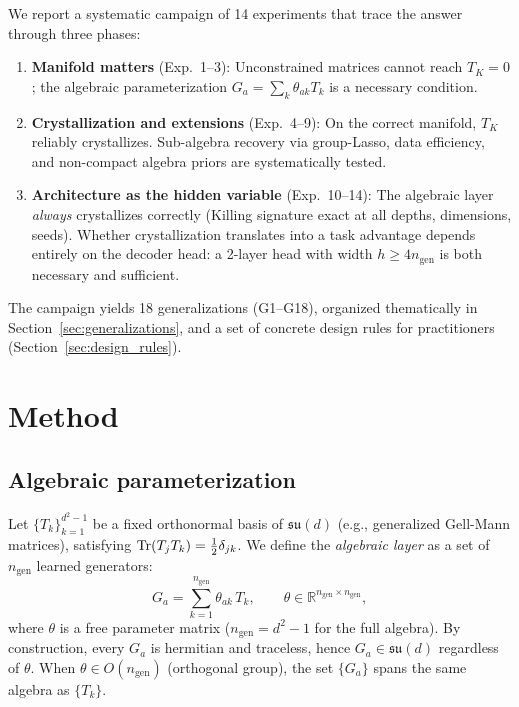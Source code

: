 \documentclass[11pt,a4paper]{article}
\newcommand{\fksu}{\mathfrak{su}}
\newcommand{\RR}{\mathbb{R}}
\newcommand{\TK}{T_K}
\newcommand{\ngen}{n_{\mathrm{gen}}}
\theoremstyle{definition}
\begin{document}
We report a systematic campaign of 14 experiments that trace the answer 
through three phases:
\begin{enumerate}[label=(\roman*)]
  \item \textbf{Manifold matters} (Exp.~1--3): Unconstrained matrices cannot 
    reach $\TK = 0$; the algebraic parameterization 
    $G_a = \sum_k \theta_{ak} T_k$ is a necessary condition.
  \item \textbf{Crystallization and extensions} (Exp.~4--9): On the correct 
    manifold, $\TK$ reliably crystallizes. Sub-algebra recovery via 
    group-Lasso, data efficiency, and non-compact algebra priors are 
    systematically tested.
  \item \textbf{Architecture as the hidden variable} (Exp.~10--14): The 
    algebraic layer \emph{always} crystallizes correctly (Killing signature 
    exact at all depths, dimensions, seeds). Whether crystallization 
    translates into a task advantage depends entirely on the decoder head: 
    a 2-layer head with width $h \geq 4\ngen$ is both necessary and 
    sufficient.
\end{enumerate}

The campaign yields 18 generalizations (G1--G18), organized thematically 
in Section~\ref{sec:generalizations}, and a set of concrete design rules 
for practitioners (Section~\ref{sec:design_rules}).


\section{Method}
\label{sec:method}

\subsection{Algebraic parameterization}
\label{sec:algebraic_param}

Let $\{T_k\}_{k=1}^{d^2-1}$ be a fixed orthonormal basis of $\fksu(d)$ 
(e.g., generalized Gell-Mann matrices), satisfying 
$\Tr(T_j T_k) = \tfrac{1}{2}\delta_{jk}$. We define the \emph{algebraic 
layer} as a set of $\ngen$ learned generators:
\begin{equation}
  \label{eq:algebraic_layer}
  G_a = \sum_{k=1}^{\ngen} \theta_{ak}\, T_k, 
  \qquad \theta \in \RR^{\ngen \times \ngen},
\end{equation}
where $\theta$ is a free parameter matrix ($\ngen = d^2 - 1$ for the 
full algebra). By construction, every $G_a$ is hermitian and traceless, 
hence $G_a \in \fksu(d)$ regardless of $\theta$. When 
$\theta \in O(\ngen)$ (orthogonal group), the set $\{G_a\}$ spans the 
same algebra as $\{T_k\}$.
\end{document}
